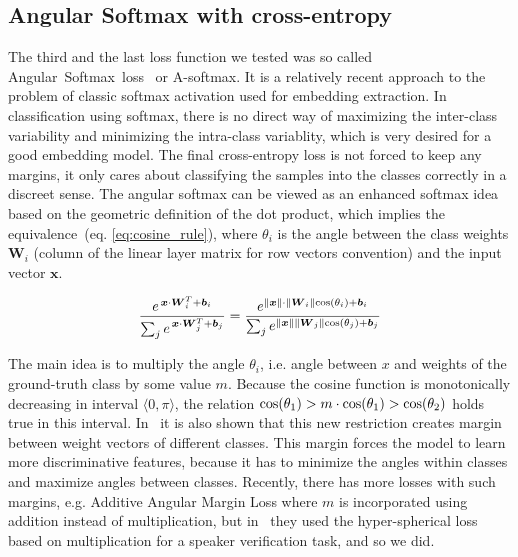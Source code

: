 \subsection*{Angular Softmax with cross-entropy}

The third and the last loss function we tested was so called Angular~Softmax~loss~\cite{A_softmax_original} or A-softmax. It is a relatively recent approach to the problem of classic softmax activation used for embedding extraction. In classification using softmax, there is no direct way of maximizing the inter-class variability and minimizing the intra-class variablity, which is very desired for a good embedding model. The final cross-entropy loss is not forced to keep any margins, it only cares about classifying the samples into the classes correctly in a discreet sense. The angular softmax can be viewed as an enhanced softmax idea based on the geometric definition of the dot product, which implies the equivalence~(eq. \ref{eq:cosine_rule}), where $ \theta_i $ is the angle between the class weights $ \boldsymbol{W}_i $ (column of the linear layer matrix for row vectors convention) and the input vector $ \boldsymbol{x} $.

\begin{equation} \label{eq:cosine_rule}
\frac{e^{\,\boldsymbol{x} \cdot \boldsymbol{W}_i^T + \boldsymbol{b}_i}}
{\sum_{j} e^{\,\boldsymbol{x} \cdot \boldsymbol{W}_j^T + \boldsymbol{b}_j}} =
\frac{e^{\lVert\boldsymbol{x}\rVert \cdot \lVert\boldsymbol{W}_i\rVert \textnormal{cos}(\theta_i)  + \boldsymbol{b}_i}}
{\sum_{j} e^{\lVert\boldsymbol{x}\rVert \lVert\boldsymbol{W}_j\rVert \textnormal{cos}(\theta_j)  + \boldsymbol{b}_j}}
\end{equation}

\medskip
\noindent
The main idea is to multiply the angle $ \theta_i $, i.e. angle between $ x $ and weights of the ground-truth class by some value $ m $. Because the cosine function is monotonically decreasing in interval $ \langle 0, \pi \rangle $, the relation $ \textnormal{cos}(\theta_1) > m \cdot \textnormal{cos}(\theta_1) > \textnormal{cos}(\theta_2) $ holds true in this interval. In~\cite{A_softmax_original} it is also shown that this new restriction creates margin between weight vectors of different classes. This margin forces the model to learn more discriminative features, because it has to minimize the angles within classes and maximize angles between classes. Recently, there has more losses with such margins, e.g. Additive Angular Margin Loss \cite{arc_face} where $ m $ is incorporated using addition instead of multiplication, but in~\cite{A_softmax} they used the hyper-spherical loss based on multiplication for a speaker verification task, and so we did.

